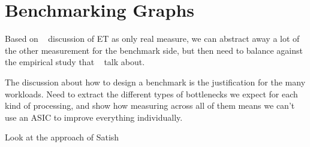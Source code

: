 \section{Benchmarking Graphs}
\label{section:14-Benchmarking-Graphs}



Based on ~\cite{Hennessy2019} discussion of ET as only real measure, we can abstract away a lot of the other measurement for the benchmark side, but then need to balance against the empirical study that ~\cite{Hooker1994,Hooker1995} talk about. 

The \cite{Hennessy2019} discussion about how to design a benchmark is the justification for the many workloads. Need to extract the different types of bottlenecks we expect for each kind of processing, and show how measuring across all of them means we can't use an ASIC to improve everything individually. 

Look at the approach of Satish~\cite{Satish2014}